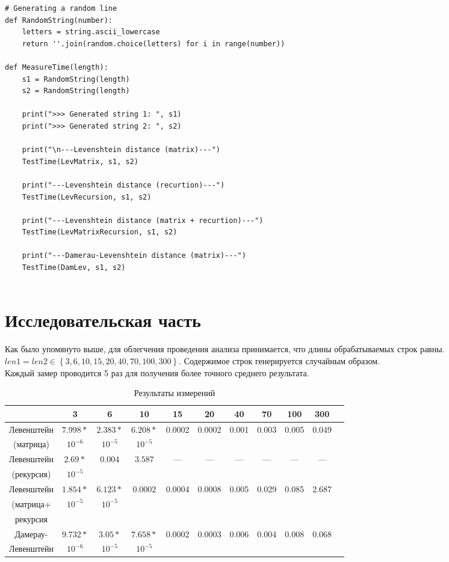 \documentclass[12pt]{report}
\begin{document}
\begin{lstlisting}[label=some-code, caption = Замеры процессорного времени]
# Generating a random line
def RandomString(number):
	letters = string.ascii_lowercase
	return ''.join(random.choice(letters) for i in range(number))

def MeasureTime(length):
	s1 = RandomString(length)
	s2 = RandomString(length)
	
	print(">>> Generated string 1: ", s1)
	print(">>> Generated string 2: ", s2)
	
	print("\n---Levenshtein distance (matrix)---")
	TestTime(LevMatrix, s1, s2)
	
	print("---Levenshtein distance (recurtion)---")
	TestTime(LevRecursion, s1, s2)
	
	print("---Levenshtein distance (matrix + recurtion)---")
	TestTime(LevMatrixRecursion, s1, s2)
	
	print("---Damerau-Levenshtein distance (matrix)---")
	TestTime(DamLev, s1, s2)
	
\end{lstlisting}

\chapter{Исследовательская часть}
Как было упомянуто выше, для облегчения проведения анализа принимается, что длины обрабатываемых строк равны. $len1 = len2 \in \left\lbrace 3, 6, 10, 15, 20, 40, 70, 100, 300\right\rbrace$. Содержимое строк генерируется случайным образом. \\

Каждый замер проводится 5 раз для получения более точного среднего результата.

\begin{table}[ph]
	\caption{Результаты измерений}
	\centering
	\begin{tabular}{|c|c|c|c|c|c|c|c|c|c|c|}
		\hline
		& 3 & 6 & 10 & 15 & 20 & 40 & 70 & 100 & 300\\
		\hline
		Левенштейн & $7.998*$ & $2.383*$ & $6.208*$ & 0.0002 & 0.0002 & 0.001 & 0.003 & 0.005 & 0.049\\
		(матрица) &$10^{-6}$&$10^{-5}$&$10^{-5}$&&&&&&\\
		\hline
		Левенштейн & $2.69*$ & $0.004$ & $3.587$ &---&---&---&---&---&---\\
		(рекурсия) &$10^{-5}$&&&&&&&&\\
		\hline
		Левенштейн & $1.854*$ & $6.123*$ & $0.0002$ & 0.0004 & 0.0008 & 0.005 & 0.029 & 0.085 & 2.687\\
		(матрица+ &$10^{-5}$&$10^{-5}$&&&&&&&\\
		рекурсия &&&&&&&&&\\
		\hline
		Дамерау- & $9.732*$ & $3.05*$ & $7.658*$ & 0.0002 & 0.0003 & 0.006 & 0.004 & 0.008 & 0.068\\
		Левенштейн &$10^{-6}$&$10^{-5}$&$10^{-5}$&&&&&&\\
		\hline	
	\end{tabular}
\end{table}
\end{document}
